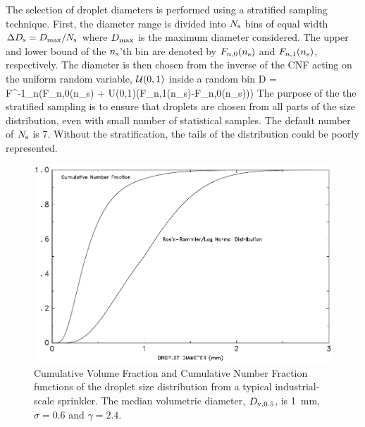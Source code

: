 The selection of droplet diameters is performed using a stratified sampling technique. First, the diameter range is divided 
into $N_{\rm s}$ bins of equal width $\Delta D_{\rm s}= D_{\rm max}/N_{\rm s}$ where $D_{\rm max}$ is the maximum diameter considered. 
The upper and lower bound of the $n_{\rm s}$'th bin are denoted by $F_{n,0}(n_{\rm s})$ and $F_{n,1}(n_{\rm s})$, respectively.
The diameter is then chosen from the inverse of the CNF acting on the uniform random variable, ${\cal U}(0,1)$ inside a random bin
\be D = F^{-1}_n\left(F_{n,0}(n_{\rm s}) + {\cal U}(0,1)\left(F_{n,1}(n_{\rm s})-F_{n,0}(n_{\rm s})\right)\right) \label{Ud_strat}  \ee
The purpose of the the stratified sampling is to ensure that droplets are 
chosen from all parts of the size distribution, even with small number of statistical samples. The
default number of $N_{\rm s}$ is 7. Without the stratification, the tails of the distribution could be poorly represented.
\begin{figure}[t]
\begin{center}
\includegraphics[width=4.5in]{FIGURES/rosin}
\caption[Liquid droplet size distribution]{Cumulative Volume Fraction and Cumulative Number
Fraction functions of the droplet size distribution from
a typical industrial-scale sprinkler. The median volumetric diameter, $D_{\rm v,0.5}$, is
1~mm, $\sigma=0.6$ and $\gamma=2.4$.}
\label{rosin}
\end{center}
\end{figure}

